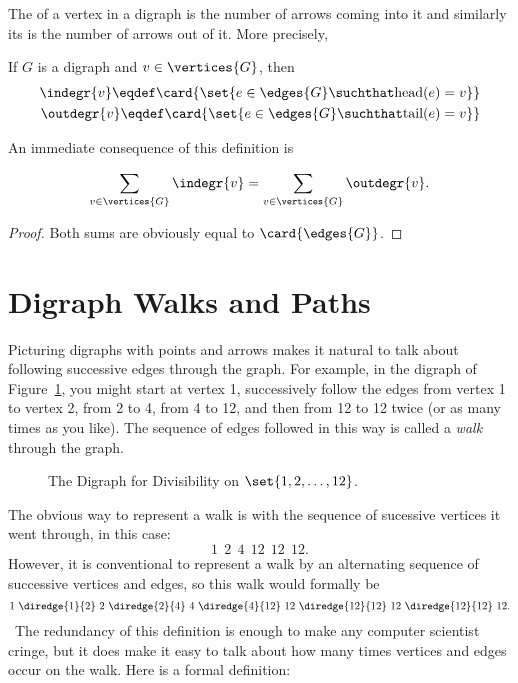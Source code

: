 The  of a vertex in a digraph is the number of arrows
coming into it and similarly its  is the number of
arrows out of it.  More precisely,
\begin{definition}\label{digraph-degree}
If $G$ is a digraph and $v \in \vertices{G}$, then
\begin{align*}
\indegr{v} \eqdef \card{\set{ e \in \edges{G} \suchthat \text{head}(e) = v}}\\
\outdegr{v} \eqdef \card{\set{ e \in \edges{G} \suchthat \text{tail}(e) = v}}\\
\end{align*}
\end{definition}

An immediate consequence of this definition is
\begin{lemma}\label{digraph-handshake}
\[
\sum_{v \in \vertices{G}} \indegr{v} = \sum_{v \in \vertices{G}} \outdegr{v}.
\]
\end{lemma}
\begin{proof}
Both sums are obviously equal to $\card{\edges{G}}$.
\end{proof}

\section{Digraph Walks and Paths}

Picturing digraphs with points and arrows makes it natural to talk
about following successive edges through the graph.  For example, in
the digraph of Figure~\ref{fig:divisibility-digraph}, you might start
at vertex 1, successively follow the edges from vertex 1 to vertex 2,
from 2 to 4, from 4 to 12, and then from 12 to 12 twice (or as many
times as you like).  The sequence of edges followed in this way is
called a \emph{walk} through the graph.

\begin{figure}
\caption{The Digraph for Divisibility on $\set{1,2,\dots,12}$.}
\label{fig:divisibility-digraph}
\end{figure}

The obvious way to represent a walk is with the sequence of sucessive
vertices it went through, in this case:
\[
1\ \:2\ \:4\ \:12\ \:12\ \:12.
\]
However, it is conventional to represent a walk by an alternating
sequence of successive vertices and edges, so this walk would formally
be
\begin{equation}\label{walk12412}
1\ \diredge{1}{2}\  2\  \diredge{2}{4}\  4\ \diredge{4}{12}\  12\ 
\diredge{12}{12}\  12\ \diredge{12}{12}\  12.
\end{equation}\
The redundancy of this definition is enough to make any computer
scientist cringe, but it does make it easy to talk about how many
times vertices and edges occur on the walk.  Here is a formal
definition:

